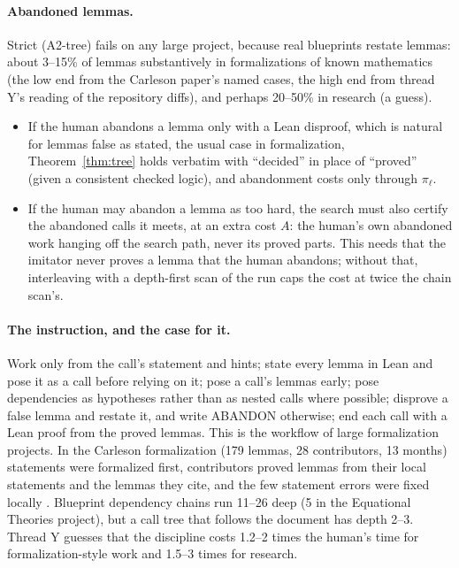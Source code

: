 \documentclass[11pt]{article}
\theoremstyle{definition}
\theoremstyle{remark}
\begin{document}
\paragraph{Abandoned lemmas.} Strict (A2-tree) fails on any large project, because real blueprints restate lemmas: about 3--15\% of lemmas substantively in formalizations of known mathematics (the low end from the Carleson paper's named cases, the high end from thread Y's reading of the repository diffs), and perhaps 20--50\% in research (a guess).
\begin{itemize}[nosep]
\item If the human abandons a lemma only with a Lean disproof, which is natural for lemmas false as stated, the usual case in formalization, Theorem~\ref{thm:tree} holds verbatim with ``decided'' in place of ``proved'' (given a consistent checked logic), and abandonment costs only through $\pi_\ell$.
\item If the human may abandon a lemma as too hard, the search must also certify the abandoned calls it meets, at an extra cost $A$: the human's own abandoned work hanging off the search path, never its proved parts. This needs that the imitator never proves a lemma that the human abandons; without that, interleaving with a depth-first scan of the run caps the cost at twice the chain scan's.
\end{itemize}

\paragraph{The instruction, and the case for it.} Work only from the call's statement and hints; state every lemma in Lean and pose it as a call before relying on it; pose a call's lemmas early; pose dependencies as hypotheses rather than as nested calls where possible; disprove a false lemma and restate it, and write ABANDON otherwise; end each call with a Lean proof from the proved lemmas. This is the workflow of large formalization projects. In the Carleson formalization (179 lemmas, 28 contributors, 13 months) statements were formalized first, contributors proved lemmas from their local statements and the lemmas they cite, and the few statement errors were fixed locally \cite{threadY}. Blueprint dependency chains run 11--26 deep (5 in the Equational Theories project), but a call tree that follows the document has depth 2--3. Thread Y guesses that the discipline costs 1.2--2 times the human's time for formalization-style work and 1.5--3 times for research.
\end{document}

